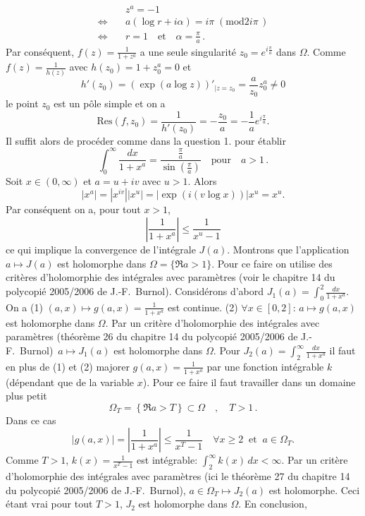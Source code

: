 {\begin{enumerate}
{$$\begin{aligned}
&z^a =-1   \\
\Longleftrightarrow \quad & a(\log r +i \alpha ) = i\pi \; (\mathrm{mod} 2i\pi \, ) \\
\Longleftrightarrow\quad & r=1 \quad \text{et} \quad \alpha =\frac{\pi}{a}\, .
\end{aligned}$$
Par cons\'equent, $f(z)=\frac{1}{1+z^a}$ a une seule singularit\'e $z_0= e^{i\frac{\pi}{a}}$ dans $\Omega$.
Comme $f(z)=\frac{1}{h(z)}$ avec $h(z_0)=1+z_0^a =0$ et
$$h'(z_0)=\left(  \exp (a\log z)\right)'_{|z=z_0}=\frac{a}{z_0}z_0^a \neq 0$$
le point $z_0$ est un p\^ole simple et on a
$$\mathrm{Res} (f,z_0) =\frac{1}{h'(z_0)} =-\frac{z_0}{a} = -\frac{1}{a} e^{i\frac{\pi}{a}}.$$
Il suffit alors de proc\'eder comme dans la question 1. pour \'etablir
$$\int_0^\infty \frac{dx}{1+x^a}=\frac{\frac{\pi}{a}}{\sin\left(\frac{\pi}{a}\right)} \quad \text{pour} \quad a>1\, .$$
Soit $x\in(0,\infty )$ et $a=u+iv$ avec $u>1$. Alors
$$|x^a|=|x^{iv}||x^u|=|\exp \left( i(v\log x)\right)|x^u =x^u.$$
Par cons\'equent on a, pour tout $x>1$,
$$\left| \frac{1}{1+x^a}\right|\leq  \frac{1}{x^u-1}$$
ce qui implique la convergence de l'int\'egrale $J(a)$.
Montrons que l'application $a\mapsto J(a)$ est holomorphe dans $\Omega=\{ \Re a >1\}$.
Pour ce faire on utilise des critères d'holomorphie des intégrales avec paramètres (voir le chapitre 14 du polycopi\'e 2005/2006 de J.-F.~Burnol).
Consid\'erons d'abord
$J_1(a)=\int_0^2 \frac{dx}{1+x^a}$. On a
(1) $(a,x)\mapsto g(a,x)=\frac{1}{1+x^a}$ est continue.
(2) $\forall x\in [0,2]$: $a\mapsto g(a,x)$ est holomorphe dans $\Omega$.
\noindent Par un critère d'holomorphie des intégrales avec paramètres  (th\'eor\`eme 26 du chapitre 14 du polycopi\'e 2005/2006 de J.-F.~Burnol)\, $a\mapsto J_1(a)$ est holomorphe dans $\Omega$.
Pour $J_2(a)=\int_2^\infty \frac{dx}{1+x^a}$ il faut en plus de (1) et (2) majorer
$g(a,x)=\frac{1}{1+x^a}$ par une fonction int\'egrable $k$ (d\'ependant que de la variable $x$).
Pour ce faire il faut travailler dans un domaine plus petit
$$\Omega_T =\left\{ \Re a>T\right\} \subset \Omega \quad , \quad T>1\, .$$
Dans ce cas
$$|g(a,x)| = \left| \frac{1}{1+x^a} \right| \leq \frac{1}{x^T-1} \quad \forall x\geq 2 \;\; \text{et} \;\; a\in \Omega _T.$$
Comme $T>1$, $k(x)=\frac{1}{x^T-1}$ est int\'egrable: $\int _2^\infty k(x)\, dx <\infty$.
Par un critère d'holomorphie des intégrales avec paramètres (ici le th\'eor\`eme 27 du chapitre 14 du polycopi\'e 2005/2006 de J.-F.~Burnol), $a\in \Omega_T \mapsto J_2(a)$ est holomorphe.
Ceci \'etant vrai pour tout $T>1$, $J_2$ est holomorphe dans $\Omega$. En conclusion,
}
\end{enumerate}}
